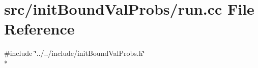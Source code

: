 \section{src/init\-Bound\-Val\-Probs/run.cc File Reference}
\label{run_8cc}
{\ttfamily \#include \char`\"{}../../include/init\-Bound\-Val\-Probs.\-h\char`\"{}}\\*
